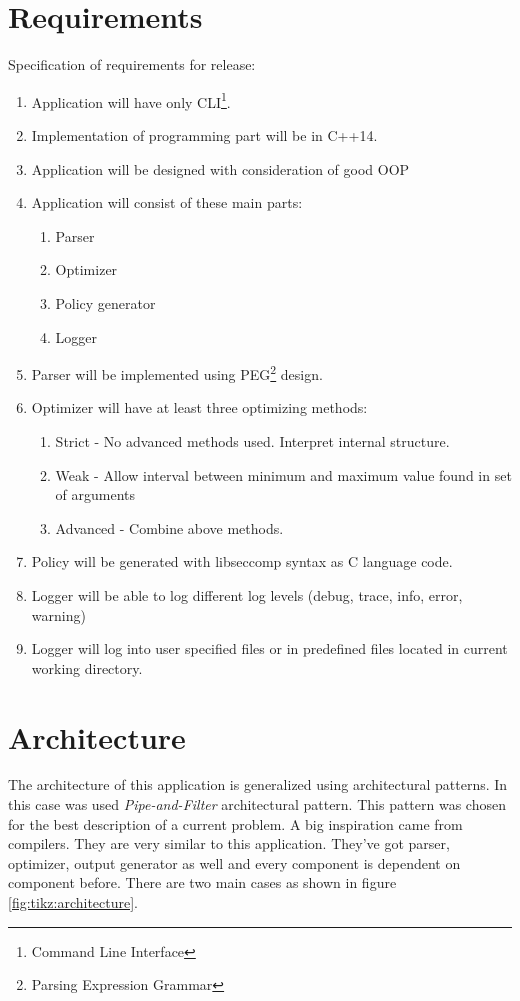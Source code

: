 \section{Requirements}
\label{sec:requirements}
Specification of requirements for release:
\begin{enumerate}
\item Application will have only CLI\footnote{Command Line Interface}.
\item Implementation of programming part will be in C++14\cite{ISO14882}.
\item Application will be designed with consideration of good OOP
\item Application will consist of these main parts:
	\begin{enumerate}
    \item Parser
    \item Optimizer
    \item Policy generator
    \item Logger
	\end{enumerate}
\item Parser will be implemented using PEG\footnote{Parsing Expression Grammar}\cite{PEG_def} design.
\item Optimizer will have at least three optimizing methods:
	\begin{enumerate}
    \item Strict - No advanced methods used. Interpret internal structure.
    \item Weak - Allow interval between minimum and maximum value found in set of arguments
    \item Advanced - Combine above methods.
	\end{enumerate}
\item Policy will be generated with libseccomp\cite{libseccomp_git} syntax as C language\cite{ISO9899} code.
\item Logger will be able to log different log levels (debug, trace, info, error, warning)
\item Logger will log into user specified files or in predefined files located in current working directory.
\end{enumerate}

\section{Architecture}
The architecture of this application is generalized using architectural patterns.
In this case was used \textit{Pipe-and-Filter}\cite{PipeAndFilter} architectural pattern.
This pattern was chosen for the best description of a current problem.
A big inspiration came from compilers.
They are very similar to this application.
They've got parser, optimizer, output generator as well and every component is dependent on component before.
There are two main cases as shown in figure \ref{fig:tikz:architecture}.

